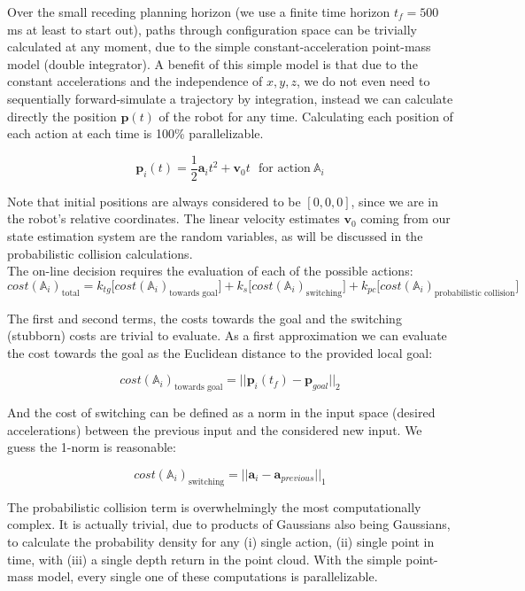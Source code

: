 \documentclass[paper=a4, fontsize=11pt]{scrartcl} %
\numberwithin{equation}{section} %
\numberwithin{figure}{section} %
\numberwithin{table}{section} %
\begin{document}
Over the small receding planning horizon (we use a finite time horizon $t_f = 500$ ms at least to start out), paths through configuration space can be trivially calculated at any moment, due to the simple constant-acceleration point-mass model (double integrator).  A benefit of this simple model is that due to the constant accelerations and the independence of $x, y, z$, we do not even need to sequentially forward-simulate a trajectory by integration, instead we can calculate directly the position $\mathbf{p}(t)$ of the robot for any time.  Calculating each position of each action at each time is 100\% parallelizable.

$$ \textbf{p}_i(t) = \frac{1}{2} \textbf{a}_i t^2 + \mathbf{v}_0 t \ \ \ \text{for action} \  \mathbb{A}_i$$

Note that initial positions are always considered to be $[0,0,0]$, since we are in the robot's relative coordinates.  The linear velocity estimates $\mathbf{v}_0$ coming from our state estimation system are the random variables, as will be discussed in the probabilistic collision calculations.\\

The on-line decision requires the evaluation of each of the possible actions:
$$ cost(\mathbb{A}_i)_{\text{total}} = k_{tg}\big[ cost(\mathbb{A}_i)_{\text{towards goal}}  \big]+  k_{s} \big[ cost(\mathbb{A}_i)_{\text{switching}} \big]+   k_{pc}\big[ cost(\mathbb{A}_i)_{\text{probabilistic collision}} \big] $$

The first and second terms, the costs towards the goal and the switching (stubborn) costs are trivial to evaluate.  As a first approximation we can evaluate the cost towards the goal as the Euclidean distance to the provided local goal:

$$cost(\mathbb{A}_i)_{\text{towards goal}} = || \mathbf{p}_i(t_f) - \mathbf{p}_{goal} ||_2 $$

And the cost of switching can be defined as a norm in the input space (desired accelerations) between the previous input and the considered new input.  We guess the 1-norm is reasonable:

$$cost(\mathbb{A}_i)_{\text{switching}} = || \textbf{a}_i - \textbf{a}_{previous} ||_1 $$

The probabilistic collision term is overwhelmingly the most computationally complex.  It is actually trivial, due to products of Gaussians also being Gaussians, to calculate the probability density for any (i) single action, (ii) single point in time, with (iii) a single depth return in the point cloud.  With the simple point-mass model, every single one of these computations is parallelizable.\\
\end{document}
